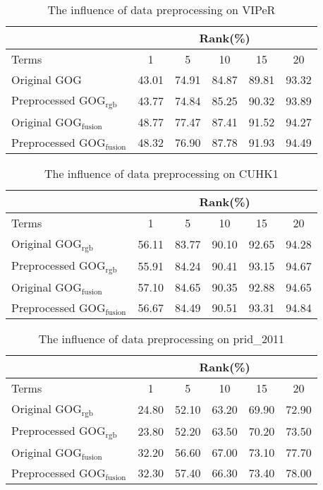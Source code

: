 \begin{table}[H]
\centering
\caption{The influence of data preprocessing on VIPeR}
\label{table:compMN1}
\begin{tabular}{|l|c|c|c|c|c|}
\hline
 & \multicolumn{5}{|c|}{Rank(\%)} \\
 \hline
Terms  &1 &5 & 10 &15& 20\\
\hline
Original GOG &43.01&74.91& 84.87& 89.81& 93.32 \\
\hline
Preprocessed GOG$_\text{rgb}$ &43.77&74.84&85.25& 90.32&93.89\\
 \hline
Original GOG$_\text{fusion}$ &48.77&77.47&87.41&91.52&94.27\\
\hline
Preprocessed GOG$_\text{fusion}$ &48.32&76.90&87.78&91.93& 94.49\\
 \hline

\end{tabular}
\end{table}


\begin{table}[H]
\centering
\caption{The influence of data preprocessing on CUHK1}
\label{table:compMN2}
\begin{tabular}{|l|c|c|c|c|c|}
\hline
 & \multicolumn{5}{|c|}{Rank(\%)} \\
 \hline
Terms  &1 &5 & 10 &15& 20\\
\hline
Original GOG$_\text{rgb}$&56.11&83.77&90.10& 92.65&94.28 \\
\hline
Preprocessed GOG$_\text{rgb}$ &55.91&84.24&90.41& 93.15&94.67\\
 \hline
Original GOG$_\text{fusion}$ &57.10&84.65& 90.35& 92.88&94.65\\
\hline
Preprocessed GOG$_\text{fusion}$ &56.67&84.49& 90.51& 93.31&94.84\\
 \hline
 
\end{tabular}
\end{table}

\begin{table}[H]
\centering
\caption{The influence of data preprocessing on prid\_2011}
\label{compMN3}
\begin{tabular}{|l|c|c|c|c|c|}
\hline
 & \multicolumn{5}{|c|}{Rank(\%)} \\
 \hline
Terms  &1 &5 & 10 &15& 20\\
\hline
Original GOG$_\text{rgb}$&24.80& 52.10& 63.20& 69.90& 72.90\\
\hline
Preprocessed GOG$_\text{rgb}$ &23.80& 52.20& 63.50& 70.20& 73.50\\
\hline
Original GOG$_\text{fusion}$ &32.20& 56.60& 67.00& 73.10& 77.70\\
\hline
Preprocessed GOG$_\text{fusion}$ &32.30& 57.40& 66.30& 73.40& 78.00\\
 \hline
 
\end{tabular}
\end{table}

